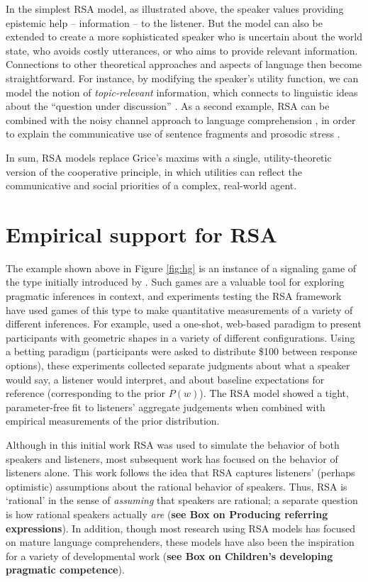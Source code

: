 \documentclass[]{elsarticle}
\begin{document}
In the simplest RSA model, as illustrated above, the speaker values
providing epistemic help -- information -- to the listener. But the model can also be extended to create a more sophisticated speaker who is uncertain
about the world state, who avoids costly utterances, or who aims to
provide relevant information. Connections to
other theoretical approaches and aspects of language then become
straightforward. For instance, by modifying the speaker's utility function, we can model the notion of \emph{topic-relevant} information, which
connects to linguistic ideas about the ``question under discussion''
\citep{roberts1996}.
As a second example, RSA can be combined with the noisy
channel approach to language comprehension \citep{levy2008},
in order to explain the communicative use of sentence fragments and prosodic stress \citep{bergen2016}.

In sum, RSA models replace Grice's maxims with a single, utility-theoretic
version of the cooperative principle, in which utilities can reflect the communicative and social priorities of a complex, real-world agent.

\section{Empirical support for RSA}\label{empirical-support-for-rsa}

The example shown above in Figure \ref{fig:hg} is an instance of a signaling game of the type  initially introduced by \citet{lewis1969}. Such games are a valuable tool for exploring pragmatic inferences in context, and experiments testing the
RSA framework have used games of this type to make quantitative
measurements of a variety of different inferences. For example, \citet{frank2012} used a one-shot, web-based paradigm to present
participants with geometric shapes in a variety of different
configurations. Using a betting paradigm (participants were asked to
distribute \$100 between response options), these experiments collected
separate judgments about what a speaker would say, a listener would
interpret, and about baseline expectations for reference (corresponding
to the prior $P(w)$). The RSA model showed a tight, parameter-free fit
to listeners' aggregate judgements when combined
with empirical measurements of the prior distribution.

Although in this initial work RSA was used to simulate the behavior of
both speakers and listeners, most subsequent work has focused on the
behavior of listeners alone. This work follows the idea that RSA captures listeners'
(perhaps optimistic) assumptions about the rational behavior of
speakers. Thus, RSA is `rational' in the sense of \emph{assuming} that
speakers are rational; a separate question is how rational speakers
actually \emph{are} (\textbf{see Box on Producing referring expressions}).
In addition, though most research using RSA models has focused on mature language comprehenders, these models have also been the inspiration for a variety of developmental work (\textbf{see Box on Children's developing pragmatic competence}).
\end{document}
